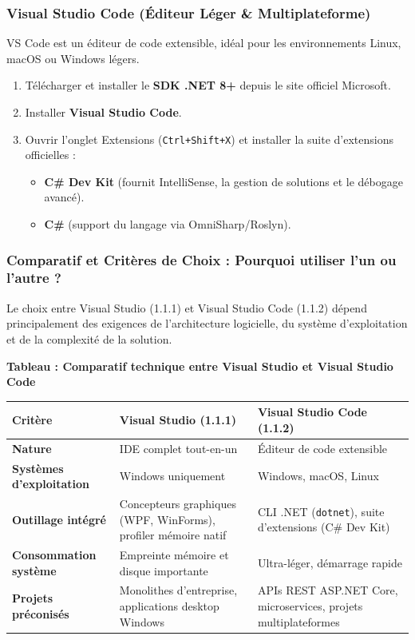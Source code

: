 \subsubsection{Visual Studio Code (Éditeur Léger \& Multiplateforme)}
VS Code est un éditeur de code extensible, idéal pour les environnements Linux, macOS ou Windows légers.
\begin{enumerate}
    \item Télécharger et installer le \textbf{SDK .NET 8+} depuis le site officiel Microsoft.
    \item Installer \textbf{Visual Studio Code}.
    \item Ouvrir l'onglet Extensions (\texttt{Ctrl+Shift+X}) et installer la suite d'extensions officielles :
    \begin{itemize}
        \item \textbf{C\# Dev Kit} (fournit IntelliSense, la gestion de solutions et le débogage avancé).
        \item \textbf{C\#} (support du langage via OmniSharp/Roslyn).
    \end{itemize}
\end{enumerate}

\subsubsection{Comparatif et Critères de Choix : Pourquoi utiliser l'un ou l'autre ?}

Le choix entre Visual Studio (1.1.1) et Visual Studio Code (1.1.2) dépend principalement des exigences de l'architecture logicielle, du système d'exploitation et de la complexité de la solution.

\begin{center}
    \textbf{Tableau : Comparatif technique entre Visual Studio et Visual Studio Code} \\[0.3cm]
    \begin{tabular}{@{}lp{6.2cm}p{6.2cm}@{}}
        \toprule
        \textbf{Critère} & \textbf{Visual Studio (1.1.1)} & \textbf{Visual Studio Code (1.1.2)} \\
        \midrule
        \textbf{Nature} & IDE complet tout-en-un & Éditeur de code extensible \\
        \textbf{Systèmes d'exploitation} & Windows uniquement & Windows, macOS, Linux \\
        \textbf{Outillage intégré} & Concepteurs graphiques (WPF, WinForms), profiler mémoire natif & CLI .NET (\texttt{dotnet}), suite d'extensions (C\# Dev Kit) \\
        \textbf{Consommation système} & Empreinte mémoire et disque importante & Ultra-léger, démarrage rapide \\
        \textbf{Projets préconisés} & Monolithes d'entreprise, applications desktop Windows & APIs REST ASP.NET Core, microservices, projets multiplateformes \\
        \bottomrule
    \end{tabular}
\end{center}

